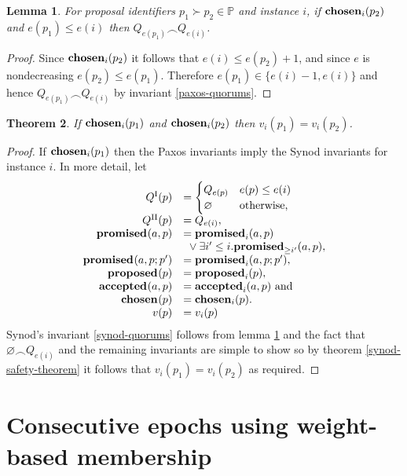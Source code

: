 \documentclass[journal]{IEEEtran}
\newtheorem{theorem}{Theorem}
\newtheorem{lemma}[theorem]{Lemma}
\begin{document}
\begin{lemma}\label{paxos-synod-quorum-invariant} For proposal identifiers $p_1
\succ p_2 \in \mathbb P$ and instance $i$, if $\mathbf{chosen}_{i}(p_2)$ and $e(p_1) \le
e(i)$ then ${Q_{e(p_1)} \frown Q_{e(i)}}$.  \end{lemma}

\begin{proof} Since $\mathbf{chosen}_{i}(p_2)$ it follows that $e(i) \le e(p_2) + 1$,
and since $e$ is nondecreasing $e(p_2) \le e(p_1)$. Therefore $e(p_1) \in \{
e(i) - 1, e(i) \}$ and hence ${Q_{e(p_1)} \frown Q_{e(i)}}$ by invariant
\ref{paxos-quorums}.  \end{proof}

\begin{theorem}\label{paxos-safety-theorem} If $\mathbf{chosen}_{i}(p_1)$ and
$\mathbf{chosen}_{i}(p_2)$ then ${v_i(p_1) = v_i(p_2)}$.  \end{theorem}

\begin{proof}
If $\mathbf{chosen}_{i}(p_1)$ then the Paxos invariants imply the Synod invariants for
instance $i$.  In more detail, let
\[\begin{array}{rl}
Q^\textrm{I}(p) &= \begin{cases}
Q_{e(p)} & e(p) \le e(i) \\
\varnothing & \textrm{otherwise,} \end{cases} \\
Q^\textrm{II}(p) &= Q_{e(i)}, \\
\mathbf{promised}_{}(a,p) &= \mathbf{promised}_{i}(a,p) \\
& \ {}\vee \exists i' \le i. \mathbf{promised}_{\ge i'}(a,p), \\
\mathbf{promised}_{}(a,p;p') &= \mathbf{promised}_{i}(a,p;p'), \\
\mathbf{proposed}_{}(p) &= \mathbf{proposed}_{i}(p), \\
\mathbf{accepted}_{}(a,p) &= \mathbf{accepted}_{i}(a,p) \textrm{ and} \\
\mathbf{chosen}_{}(p) &= \mathbf{chosen}_{i}(p). \\
v(p) &= v_i(p)\\
\end{array}
\]
Synod's invariant \ref{synod-quorums} follows from lemma
\ref{paxos-synod-quorum-invariant} and the fact that $\varnothing \frown
Q_{e(i)}$ and the remaining invariants are simple to show so by theorem
\ref{synod-safety-theorem} it follows that $v_i(p_1) = v_i(p_2)$ as required.
\end{proof}


\section{Consecutive epochs using weight-based membership}
\end{document}
